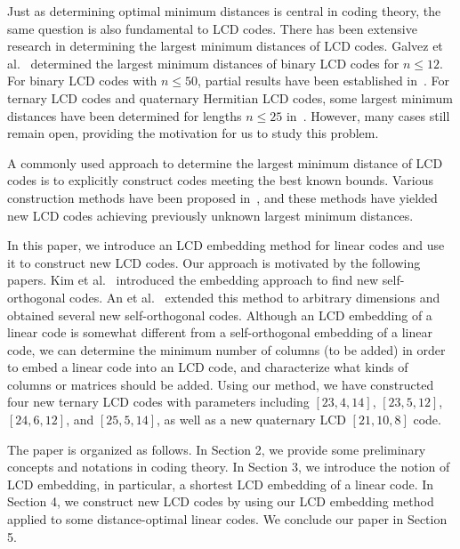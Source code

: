 \documentclass{article}
\theoremstyle{definition}
\theoremstyle{remark}
\begin{document}
Just as determining optimal minimum distances is central in coding theory, the same question is also fundamental to LCD codes. There has been extensive research in determining the largest minimum distances of LCD codes. Galvez et al.~\cite{Galvez-bound-LCD} determined the largest minimum distances of binary LCD codes for $n\le 12$. For binary LCD codes with $n\le 50$, partial results have been established in~\cite{Araya-optimal-LCD-2020,Bouyuklieva-optimal-LCD-2021,Harada-optimal-LCD-2019,Ishizuka-optimal-LCD-2023,Li-optimal-LCD-2024-1,Wang-optimal-LCD-2024-2}. For ternary LCD codes and quaternary Hermitian LCD codes, some largest minimum distances have been determined for lengths $n\le 25$ in~\cite{Araya-ternary-LCD-2020,Araya-ternary-LCD-2021,Lu-quaternary-LCD,Li-optimal-LCD-2024-1}. However, many cases still remain open, providing the motivation for us to study this problem.

A commonly used approach to determine the largest minimum distance of LCD codes is to explicitly construct codes meeting the best known bounds. Various construction methods have been proposed in~\cite{Araya-ternary-LCD-2021,Bouyuklieva-optimal-LCD-2021,Harada-optimal-LCD-2019,Ishizuka-optimal-LCD-2023,Kim-building-up,Lu-quaternary-LCD,Li-optimal-LCD-2024-1,Wang-optimal-LCD-2024-2}, and these methods have yielded new LCD codes achieving previously unknown largest minimum distances.

In this paper, we introduce an LCD embedding method for linear codes and use it to construct new LCD codes. Our approach is motivated by the following papers. Kim et al.~\cite{Kim-SO-embedding-2,Kim-SO-embedding-1} introduced the embedding approach to find new self-orthogonal codes. An et al.~\cite{An-SO-embedding} extended this method to arbitrary dimensions and obtained several new self-orthogonal codes.
Although an LCD embedding of a linear code is somewhat different from a self-orthogonal embedding of a linear code, we can determine the minimum number of columns (to be added) in order to embed a linear code into an LCD code, and characterize what kinds of columns or matrices should be added. Using our method, we have constructed four new ternary LCD codes with parameters including  $[23, 4, 14]$, $[23, 5, 12]$, $[24, 6, 12]$, and $[25, 5, 14]$, as well as a new quaternary LCD $[21, 10, 8]$ code.

The paper is organized as follows. In Section 2, we provide some preliminary concepts and notations in coding theory. In Section 3, we introduce the notion of LCD embedding, in particular, a shortest LCD embedding of a linear code. In Section 4, we construct new LCD codes by using our LCD embedding method applied to some distance-optimal linear codes. We conclude our paper in Section 5.
\end{document}
